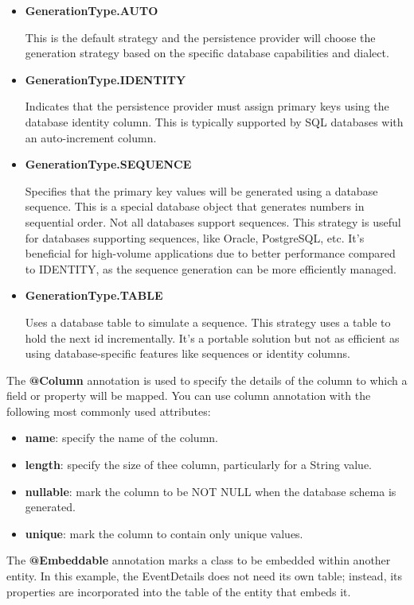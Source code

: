 \begin{itemize}
\item \textbf{GenerationType.AUTO}

This is the default strategy and the persistence provider will choose the generation strategy based on the specific database capabilities and dialect. 

\item \textbf{GenerationType.IDENTITY}

Indicates that the persistence provider must assign primary keys using the database identity column. This is typically supported by SQL databases with an auto-increment column.

\item \textbf{GenerationType.SEQUENCE}

Specifies that the primary key values will be generated using a database sequence. This is a special database object that generates numbers in sequential order. Not all databases support sequences.
This strategy is useful for databases supporting sequences, like Oracle, PostgreSQL, etc. It's beneficial for high-volume applications due to better performance compared to IDENTITY, as the sequence generation can be more efficiently managed.

\item \textbf{GenerationType.TABLE}

Uses a database table to simulate a sequence. This strategy uses a table to hold the next id incrementally. It's a portable solution but not as efficient as using database-specific features like sequences or identity columns.
\end{itemize}

The \textbf{@Column} annotation is used to specify the details of the column to which a field or property will be mapped. You can use column annotation with the following most commonly used attributes:
\begin{itemize}
\item \textbf{name}: specify the name of the column.
\item \textbf{length}: specify the size of thee column, particularly for a String value.
\item \textbf{nullable}: mark the column to be NOT NULL when the database schema is generated.
\item \textbf{unique}: mark the column to contain only unique values.
\end{itemize}


The \textbf{@Embeddable} annotation marks a class to be embedded within another entity.
In this example,  the EventDetails does not need its own table; instead, its properties are incorporated into the table of the entity that embeds it.

